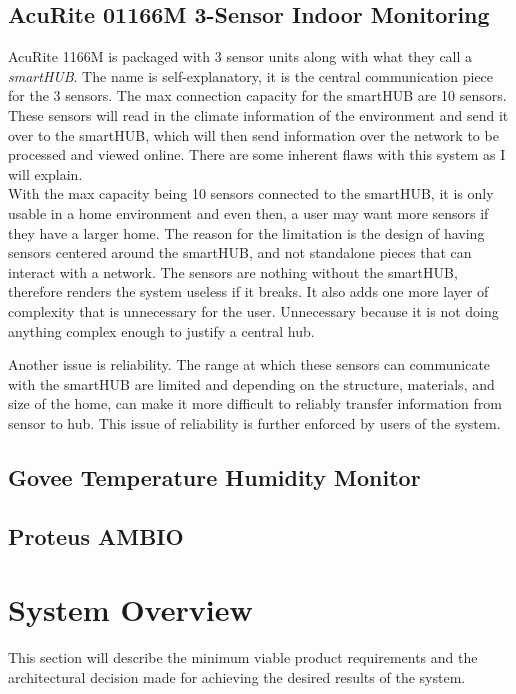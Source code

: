 \documentclass{article}
\begin{document}
\subsection{AcuRite 01166M 3-Sensor Indoor Monitoring}
AcuRite 1166M is packaged with 3 sensor units along with what they call a \textit{smartHUB}. The name is self-explanatory, it is the central communication piece for the 3 sensors. The max connection capacity for the smartHUB are 10 sensors. These sensors will read in the climate information of the environment and send it over to the smartHUB, which will then send information over the network to be processed and viewed online. There are some inherent flaws with this system as I will explain.\\

With the max capacity being 10 sensors connected to the smartHUB, it is only usable in a home environment and even then, a user may want more sensors if they have a larger home. The reason for the limitation is the design of having sensors centered around the smartHUB, and not standalone pieces that can interact with a network. The sensors are nothing without the smartHUB, therefore renders the system useless if it breaks. It also adds one more layer of complexity that is unnecessary for the user. Unnecessary because it is not doing anything complex enough to justify a central hub.

Another issue is reliability. The range at which these sensors can communicate with the smartHUB are limited and depending on the structure, materials, and size of the home, can make it more difficult to reliably transfer information from sensor to hub. This issue of reliability is further enforced by users of the system.

\subsection{Govee Temperature Humidity Monitor}
\subsection{Proteus AMBIO}

\section{System Overview}
\label{section:overview}
This section will describe the minimum viable product requirements and the architectural decision made for achieving the desired results of the system.
\end{document}

